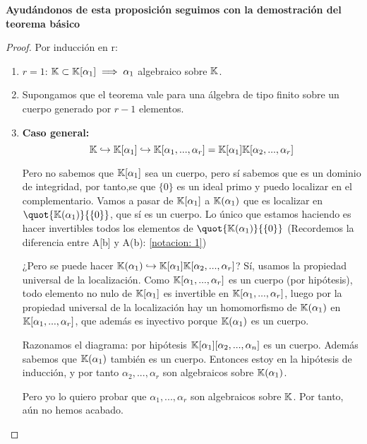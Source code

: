 \textbf{Ayudándonos de esta proposición seguimos con la demostración del teorema básico}
\begin{proof}
	Por inducción en r:
	\begin{enumerate}
		\item $r=1$: $\mathbb{K} \subset \mathbb{K}[\alpha_1] \implies \alpha_1$ algebraico sobre $\mathbb{K}$.
		\item Supongamos que el teorema vale para una álgebra de tipo finito sobre un cuerpo generado por $r-1$ elementos.
		\item \textbf{Caso general:}
		$$\mathbb{K} \hookrightarrow \mathbb{K}[\alpha_1] \hookrightarrow \mathbb{K}[\alpha_1,...,\alpha_r]=\mathbb{K}[\alpha_1]\mathbb{K}[\alpha_2,...,\alpha_r]$$

		Pero no sabemos que $\mathbb{K}[\alpha_1]$ sea un cuerpo, pero sí sabemos que es un dominio de integridad, por tanto,se que $\{0\}$ es un ideal primo y puedo localizar en el complementario. Vamos a pasar de $\mathbb{K}[\alpha_1]$ a $\mathbb{K}(\alpha_1)$ que es localizar en $\quot{\K(\alpha_1)}{\{0\}}$, que sí es un cuerpo. Lo único que estamos haciendo es hacer invertibles todos los elementos de $\quot{\K(\alpha_1)}{\{0\}}$ (Recordemos la diferencia entre A[b] y A(b): \ref{notacion: 1})

		¿Pero se puede hacer $\mathbb{K}(\alpha_1) \hookrightarrow \mathbb{K}[\alpha_1]\mathbb{K}[\alpha_2,...,\alpha_r]$?  Sí, usamos la propiedad universal de la localización. Como $\mathbb{K}[\alpha_1,...,\alpha_r]$ es un cuerpo (por hipótesis), todo elemento no nulo de $\mathbb{K}[\alpha_1]$ es invertible en $\mathbb{K}[\alpha_1,...,\alpha_r]$, luego por la propiedad universal de la localización hay un homomorfismo de $\mathbb{K}(\alpha_1)$ en $\mathbb{K}[\alpha_1,...,\alpha_r]$, que además es inyectivo porque $\mathbb{K}(\alpha_1)$ es un cuerpo.


		Razonamos el diagrama: por hipótesis $\mathbb{K}[\alpha_1][\alpha_2,...,\alpha_n]$ es un cuerpo. Además sabemos que  $\mathbb{K}(\alpha_1)$ también es un cuerpo. Entonces estoy en la hipótesis de inducción, y por tanto $\alpha_2,...,\alpha_r$ son algebraicos sobre $\mathbb{K}(\alpha_1)$.

		Pero yo lo quiero probar que $\alpha_1,..., \alpha_r$ son algebraicos sobre $\mathbb{K}$. Por tanto, aún no hemos acabado.


\end{enumerate}
\end{proof}

